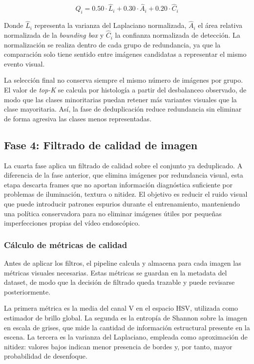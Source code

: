 ﻿\documentclass[10pt,a4paper,twocolumn,twoside]{article}
\begin{document}
\[
Q_i = 0.50 \cdot \hat{L}_i + 0.30 \cdot \hat{A}_i + 0.20 \cdot \hat{C}_i
\]

Donde $\hat{L}_i$ representa la varianza del Laplaciano normalizada, $\hat{A}_i$ el área relativa normalizada de la \textit{bounding box} y $\hat{C}_i$ la confianza normalizada de detección. La normalización se realiza dentro de cada grupo de redundancia, ya que la comparación solo tiene sentido entre imágenes candidatas a representar el mismo evento visual.

La selección final no conserva siempre el mismo número de imágenes por grupo. El valor de \textit{top-K} se calcula por histología a partir del desbalanceo observado, de modo que las clases minoritarias puedan retener más variantes visuales que la clase mayoritaria. Así, la fase de deduplicación reduce redundancia sin eliminar de forma agresiva las clases menos representadas.

\subsection{Fase 4: Filtrado de calidad de imagen}
La cuarta fase aplica un filtrado de calidad sobre el conjunto ya deduplicado. A diferencia de la fase anterior, que elimina imágenes por redundancia visual, esta etapa descarta frames que no aportan información diagnóstica suficiente por problemas de iluminación, textura o nitidez. El objetivo es reducir el ruido visual que puede introducir patrones espurios durante el entrenamiento, manteniendo una política conservadora para no eliminar imágenes útiles por pequeñas imperfecciones propias del vídeo endoscópico.

\subsubsection{Cálculo de métricas de calidad}
Antes de aplicar los filtros, el pipeline calcula y almacena para cada imagen las métricas visuales necesarias. Estas métricas se guardan en la metadata del dataset, de modo que la decisión de filtrado queda trazable y puede revisarse posteriormente.

La primera métrica es la media del canal V en el espacio HSV, utilizada como estimador de brillo global. La segunda es la entropía de Shannon sobre la imagen en escala de grises, que mide la cantidad de información estructural presente en la escena. La tercera es la varianza del Laplaciano, empleada como aproximación de nitidez: valores bajos indican menor presencia de bordes y, por tanto, mayor probabilidad de desenfoque.
\end{document}
